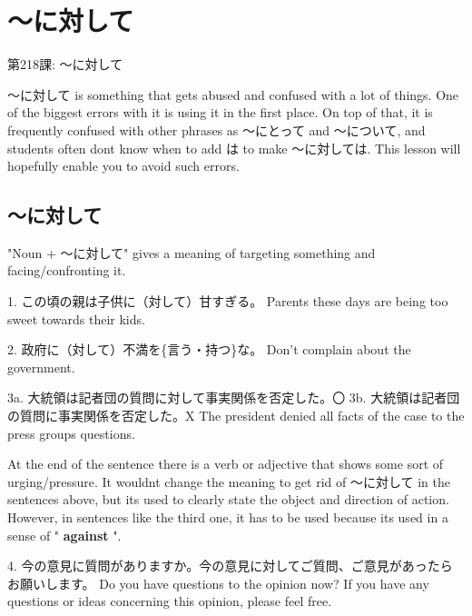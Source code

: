     
\chapter{～に対して}

\begin{center}
\begin{Large}
第218課: ～に対して 
\end{Large}
\end{center}
 
\par{ ～に対して is something that gets abused and confused with a lot of things. One of the biggest errors with it is using it in the first place. On top of that, it is frequently confused with other phrases as ～にとって and ～について, and students often don\textquotesingle t know when to add は to make ～に対しては. This lesson will hopefully enable you to avoid such errors. }
      
\section{～に対して}
 
\par{ "Noun + ～に対して" gives a meaning of targeting something and facing\slash confronting it. }

\par{1. この頃の親は子供に（対して）甘すぎる。 \hfill\break
Parents these days are being too sweet towards their kids. }

\par{2. 政府に（対して）不満を\{言う・持つ\}な。 \hfill\break
Don't complain about the government. }

\par{3a. 大統領は記者団の質問に対して事実関係を否定した。〇 \hfill\break
3b. 大統領は記者団の質問に事実関係を否定した。X \hfill\break
The president denied all facts of the case to the press group\textquotesingle s questions. }

\par{ At the end of the sentence there is a verb or adjective that shows some sort of urging\slash pressure. It wouldn\textquotesingle t change the meaning to get rid of ～に対して in the sentences above, but it\textquotesingle s used to clearly state the object and direction of action. However, in sentences like the third one, it has to be used because it\textquotesingle s used in a sense of " \textbf{against }". }

\par{4. 今の意見に質問がありますか。今の意見に対してご質問、ご意見があったらお願いします。 \hfill\break
Do you have questions to the opinion now? If you have any questions or ideas concerning this opinion, please feel free. }

